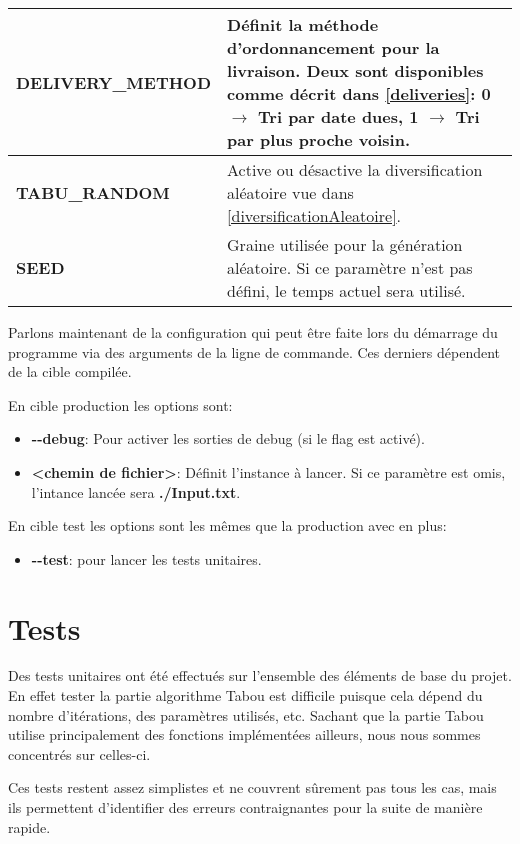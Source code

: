 \documentclass[hideweeklyreports]{polytech/polytech}
\begin{document}
\begin{tabularx}{\textwidth}{|l|X|}
					\textbf{DELIVERY\_METHOD} & Définit la méthode d'ordonnancement pour la livraison. Deux sont disponibles comme décrit dans \autoref{deliveries}:
						0 $\rightarrow$ Tri par date dues, 
						1 $\rightarrow$ Tri par plus proche voisin.
						\\\hline
					\textbf{TABU\_RANDOM} & Active ou désactive la diversification aléatoire vue dans \autoref{diversificationAleatoire}.\\\hline
					\textbf{SEED} & Graine utilisée pour la génération aléatoire. Si ce paramètre n'est pas défini, le temps actuel sera utilisé.\\\hline
				\end{tabularx}		
				
				Parlons maintenant de la configuration qui peut être faite lors du démarrage du programme via des arguments de la ligne de commande. Ces derniers dépendent de la cible compilée.
				
				En cible production les options sont:
				\begin{itemize}
					\item \textbf{-{}-debug}: Pour activer les sorties de debug (si le flag est activé).
					\item \textbf{<chemin de fichier>}: Définit l'instance à lancer. Si ce paramètre est omis, l'intance lancée sera \textbf{./Input.txt}.
				\end{itemize}
				
				En cible test les options sont les mêmes que la production avec en plus:
				\begin{itemize}
					\item \textbf{-{}-test}: pour lancer les tests unitaires.
				\end{itemize}
		
		\section{\label{unit}Tests}
			Des tests unitaires ont été effectués sur l'ensemble des éléments de base du projet. En effet tester la partie algorithme Tabou est difficile puisque cela dépend du nombre d'itérations, des paramètres utilisés, etc. Sachant que la partie Tabou utilise principalement des fonctions implémentées ailleurs, nous nous sommes concentrés sur celles-ci.
			
			Ces tests restent assez simplistes et ne couvrent sûrement pas tous les cas, mais ils permettent d'identifier des erreurs contraignantes pour la suite de manière rapide.
			
\end{document}

